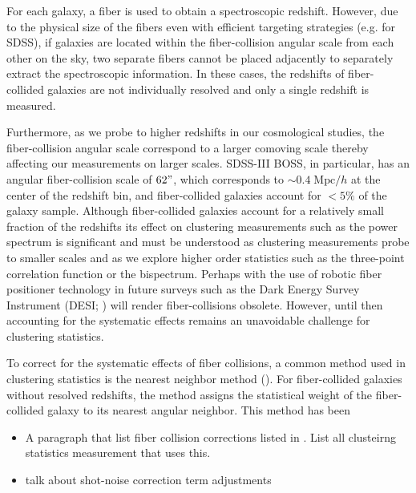 \documentclass{emulateapj}
\begin{document}
For each galaxy, a fiber is used to obtain a spectroscopic redshift. However, due to the physical size of the fibers even with efficient targeting strategies (e.g. \citealt{Blanton:2003ab} for SDSS), if galaxies are located within the fiber-collision angular scale from each other on the sky, two separate fibers cannot be placed adjacently to separately extract the spectroscopic information. In these cases, the redshifts of fiber-collided galaxies are not individually resolved and only a single redshift is measured. 

Furthermore, as we probe to higher redshifts in our cosmological studies, the fiber-collision angular scale correspond to a larger comoving scale thereby affecting our measurements on larger scales. SDSS-III BOSS, in particular, has an angular fiber-collision scale of $62"$, which corresponds to $\sim 0.4 \;\mathrm{Mpc}/h$ at the center of the redshift bin, and fiber-collided galaxies account for $< 5\%$ of the galaxy sample. Although fiber-collided galaxies account for a relatively small fraction of the redshifts its effect on clustering measurements such as the power spectrum is significant and must be understood as clustering measurements probe to smaller scales and as we explore higher order statistics such as the three-point correlation function or the bispectrum. Perhaps with the use of robotic fiber positioner technology in future surveys such as the Dark Energy Survey Instrument (DESI; \citealt{Schlegel:2011aa, Morales:2012aa, Makarem:2014aa}) will render fiber-collisions obsolete. However, until then accounting for the systematic effects remains an unavoidable challenge for clustering statistics. 

To correct for the systematic effects of fiber collisions, a common method used in clustering statistics is the nearest neighbor method (\citealt{Zehavi:2002aa, Berlind:2006aa, Anderson:2012aa}). For fiber-collided galaxies without resolved redshifts, the method assigns the statistical weight of the fiber-collided galaxy to its nearest angular neighbor. This method has been 	

\begin{itemize}
\item A paragraph that list fiber collision corrections listed in \cite{Guo:2012aa} \cite{Zehavi:2002aa}. List all clusteirng statistics measurement that uses this.
\item talk about shot-noise correction term adjustments
\end{itemize}
\end{document}
